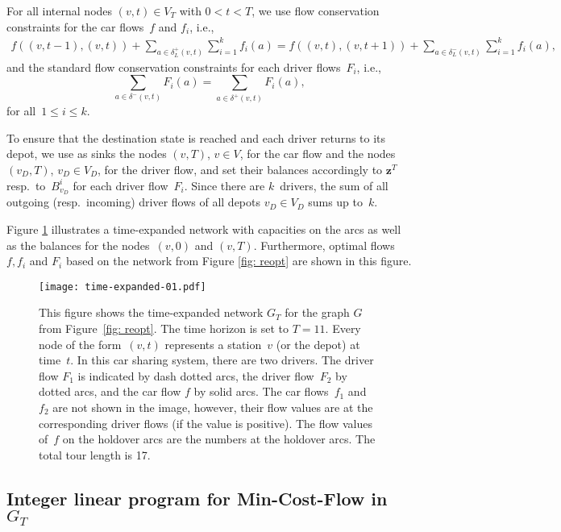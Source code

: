 \documentclass[english]{llncs}
\numberwithin{sublemma}{lemma}
\newcommand{\fc}{\ensuremath{f}}
\newcommand{\fd}{\ensuremath{F}}
\newcommand{\bd}{\ensuremath{B}}
\newcommand{\z}{\boldsymbol{z}}
\newcommand{\VD}{V_D}
\begin{document}
For all internal nodes $(v, t) \in V_T$ with $0 < t < T$, we use flow conservation constraints for the car flows~$\fc$ and $\fc_i$, i.e.,
\[
    \begin{aligned}
    \fc((v, t-1), (v, t)) + \sum_{a\in \delta^+_L(v,t)} \sum_{i=1}^k \fc_i(a) 
        = \fc((v, t), (v, t+1)) + \sum_{a \in \delta^-_L(v,t)} \sum_{i=1}^k \fc_i(a),
    \end{aligned}
\]
and the standard flow conservation constraints for each driver flows~$\fd_i$, i.e.,
\[
  \sum_{a\in \delta^-(v,t)} \fd_i(a) = \sum_{a\in \delta^+(v,t)} \fd_i(a),
\]
for all~$1 \leq i \leq k$.


To ensure that the destination state is reached and each driver returns to its depot, we use as sinks the nodes $(v, T)$, $v \in V$, for the car flow 
and the nodes $(v_D, T)$, $v_D \in \VD$, for the driver flow, and set their balances accordingly to $\z^T$ resp.~to~$\bd_{v_D}^i$ for each driver flow~$\fd_i$.
Since there are $k$~drivers, the sum of all outgoing (resp.~incoming) driver flows of all depots $v_D \in \VD$ sums up to~$k$.


Figure \ref{fig: flownetwork} illustrates a time-expanded network with capacities on the arcs as well as the balances for the nodes~$(v, 0)$ and $(v, T)$.
Furthermore, optimal flows $\fc, \fc_i$ and $\fd_i$ based on the network from Figure \ref{fig: reopt} are shown in this figure.


\begin{figure}
  \centering
  \texttt{[image: time-expanded-01.pdf]}
  \caption{This figure shows the time-expanded network $G_T$ for the graph $G$ from Figure~\ref{fig: reopt}.
    The time horizon is set to $T = 11$.
    Every node of the form~$(v,t)$ represents a station~$v$ (or the depot) at time~$t$.
    In this car sharing system, there are two drivers.
    The driver flow $\fd_1$ is indicated by dash dotted arcs, the driver flow~$\fd_2$ by dotted arcs, and the car flow $\fc$ by solid arcs.
    The car flows~$\fc_1$ and~$\fc_2$ are not shown in the image, however, their flow values are at the corresponding driver flows (if the value is positive).
    The flow values of~$\fc$ on the holdover arcs are the numbers at the holdover arcs.
    The total tour length is 17.}
  \label{fig: flownetwork}
\end{figure}




\subsection{Integer linear program for Min-Cost-Flow in $G_T$}
\label{sec: static: min-cost flows: ilp: wo pre w back}
\end{document}
